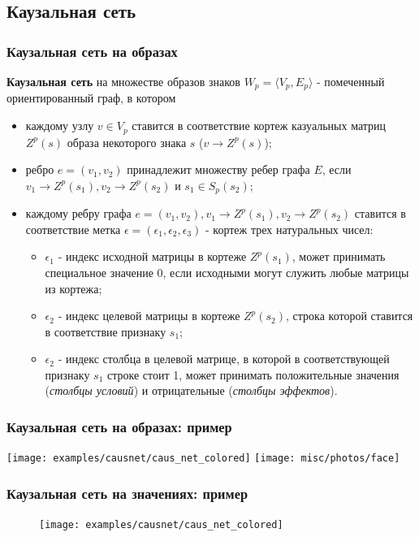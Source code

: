 \documentclass[default]{beamer}
\begin{document}
	\subsection{Каузальная сеть}
	\begin{frame}
		\frametitle{Каузальная сеть на образах}
		\footnotesize
		\textbf{Каузальная сеть} на множестве образов знаков $W_p=\langle V_p, E_p \rangle$ - помеченный ориентированный граф, в котором
		\begin{itemize}
			\item каждому узлу $v\in V_p$ ставится в соответствие кортеж казуальных матриц $Z^p(s)$ образа некоторого знака $s$ ($v\rightarrow Z^p(s)$);
			\item ребро $e=(v_1, v_2)$ принадлежит множеству ребер графа $E$, если $v_1\rightarrow Z^p(s_1), v_2\rightarrow Z^p(s_2)$ и $s_1\in S_p(s_2)$;
			\item каждому ребру графа $e=(v_1, v_2), v_1\rightarrow Z^p(s_1), v_2\rightarrow Z^p(s_2)$ ставится в соответствие метка $\epsilon=(\epsilon_1,\epsilon_2,\epsilon_3)$ - кортеж трех натуральных чисел:
			\begin{itemize}
				\item $\epsilon_1$ - индекс исходной матрицы в кортеже $Z^p(s_1)$, может принимать специальное значение 0, если исходными могут служить любые матрицы из кортежа;
				\item $\epsilon_2$ - индекс целевой матрицы в кортеже $Z^p(s_2)$, строка которой ставится в соответствие признаку $s_1$;
				\item $\epsilon_2$ - индекс столбца в целевой матрице, в которой в соответствующей признаку $s_1$ строке стоит 1, может принимать положительные значения (\textit{столбцы условий}) и отрицательные (\textit{столбцы эффектов}).
			\end{itemize}		
		\end{itemize}
	\end{frame}

	\begin{frame}
		\frametitle{Каузальная сеть на образах: пример}
		
		\centering
		\texttt{[image: examples/causnet/caus\_net\_colored]}
		\texttt{[image: misc/photos/face]}
	
		\nocite{*}
		\printbibliography[keyword={signopernew}, resetnumbers=true]
	\end{frame}

	\begin{frame}
		\frametitle{Каузальная сеть на значениях: пример}
		
		\begin{figure}
			\texttt{[image: examples/causnet/caus\_net\_colored]}
		\end{figure}
		
	\end{frame}
\end{document}
